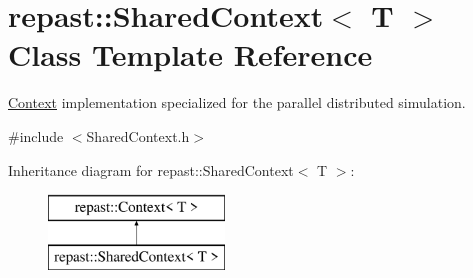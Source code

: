 \hypertarget{classrepast_1_1_shared_context}{\section{repast\-:\-:Shared\-Context$<$ T $>$ Class Template Reference}
\label{classrepast_1_1_shared_context}
}


\hyperlink{classrepast_1_1_context}{Context} implementation specialized for the parallel distributed simulation.  




{\ttfamily \#include $<$Shared\-Context.\-h$>$}

Inheritance diagram for repast\-:\-:Shared\-Context$<$ T $>$\-:\begin{figure}[H]
\begin{center}
\leavevmode
\includegraphics[height=2.000000cm]{classrepast_1_1_shared_context}
\end{center}
\end{figure}
